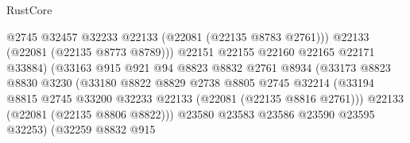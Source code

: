 \begin{lexlean}{RustCore}
\begin{coremodule}
                                              @2745
                                              @32457
                                              @32233
                                              @22133
                                              (@22081 (@22135 @8783 @2761)))
                                            @22133
                                            (@22081 (@22135 @8773 @8789)))
                                          @22151
                                          @22155
                                          @22160
                                          @22165
                                          @22171
                                          @33884)
                                        (@33163
                                          @915
                                          @921
                                          @94
                                          @8823
                                          @8832
                                          @2761
                                          @8934
                                          (@33173
                                            @8823
                                            @8830
                                            @3230
                                            (@33180
                                              @8822
                                              @8829
                                              @2738
                                              @8805
                                              @2745
                                              @32214
                                              (@33194
                                                @8815
                                                @2745
                                                @33200
                                                @32233
                                                @22133
                                                (@22081 (@22135 @8816 @2761)))
                                              @22133
                                              (@22081 (@22135 @8806 @8822)))
                                            @23580
                                            @23583
                                            @23586
                                            @23590
                                            @23595
                                            @32253)
                                          (@32259
                                            @8832
                                            @915

\end{coremodule}
\end{lexlean}
